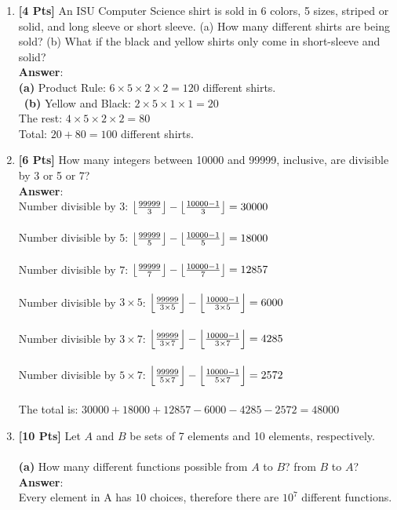 \documentclass[11pt]{article}
\DeclarePairedDelimiter\floor{\lfloor}{\rfloor}
\begin{document}
\begin{enumerate}

\item {\bf [4 Pts]} An ISU Computer Science shirt is sold in 6 colors, 5 sizes, striped or solid, and long sleeve or short sleeve. (a) How many different shirts are being sold? (b) What if the black and yellow shirts only come in short-sleeve and solid?\\
\textbf{Answer}:\\
\textbf{(a)} Product Rule: $6 \times 5 \times 2 \times 2 = 120$ different shirts.\\\
\textbf{(b)} Yellow and Black: $2 \times 5 \times 1 \times 1 = 20$\\
The rest: $4 \times 5 \times 2 \times 2 = 80$\\
Total: $20 + 80 = 100$ different shirts.\\

\item {\bf [6 Pts]} How many integers between 10000 and 99999, inclusive, are divisible by 3 or 5 or 7?\\
\textbf{Answer}:\\
Number divisible by $3$: $\floor*{\frac{99999}{3}} - \floor*{\frac{10000-1}{3}} = 30000$\\\\
Number divisible by $5$: $\floor*{\frac{99999}{5}} - \floor*{\frac{10000-1}{5}} = 18000$\\\\
Number divisible by $7$: $\floor*{\frac{99999}{7}} - \floor*{\frac{10000-1}{7}} = 12857$\\\\
Number divisible by $3 \times 5$: $\floor*{\frac{99999}{3 \times 5}} - \floor*{\frac{10000-1}{3 \times 5}} = 6000$\\\\
Number divisible by $3 \times 7$: $\floor*{\frac{99999}{3 \times 7}} - \floor*{\frac{10000-1}{3 \times 7}} = 4285$\\\\
Number divisible by $5 \times 7$: $\floor*{\frac{99999}{5 \times 7}} - \floor*{\frac{10000-1}{5 \times 7}} = 2572$\\\\

The total is: $30000 + 18000 + 12857 - 6000 - 4285 - 2572 =  48000$\\
 
 \clearpage
 
\item {\bf [10 Pts]} Let $A$ and $B$ be sets of 7 elements and 10 elements, respectively.\\\\
        \textbf{(a)} How many different functions possible from $A$ to $B$? from $B$ to $A$?\\
\textbf{Answer}:\\
Every element in A has $10$ choices, therefore there are $10^7$ different functions.\\


\end{enumerate}
\end{document}
